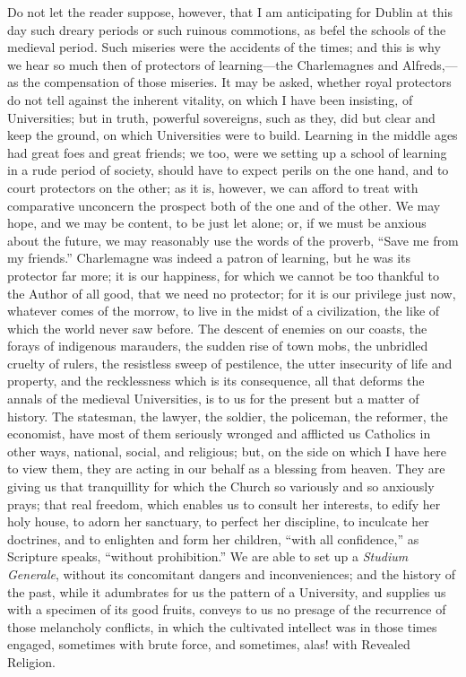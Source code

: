 Do not let the reader suppose, however, that I am anticipating for
Dublin at this day such dreary periods or such ruinous commotions, as
befel the schools of the medieval period. Such miseries were the
accidents of the times; and this is why we hear so much then of
protectors of learning—the Charlemagnes and Alfreds,—as the
compensation of those miseries. It may be asked, whether royal
protectors do not tell against the inherent vitality, on which I have
been insisting, of Universities; but in truth, powerful sovereigns,
such as they, did but clear and keep the ground, on which Universities
were to build. Learning in the middle ages had great foes and great
friends; we too, were we setting up a school of learning in a rude
period of society, should have to expect perils on the one hand, and
to court protectors on the other; as it is, however, we can afford to
treat with comparative unconcern the prospect both of the one and of
the other. We may hope, and we may be content, to be just let alone;
or, if we must be anxious about the future, we may reasonably use the
words of the proverb, ``Save me from my friends.'' Charlemagne
was indeed a patron of learning, but he was its protector far more; it
is our happiness, for which we cannot be too thankful to the Author of
all good, that we need no protector; for it is our privilege just now,
whatever comes of the morrow, to live in the midst of a civilization,
the like of which the world never saw before. The descent of enemies
on our coasts, the forays of indigenous marauders, the sudden rise of
town mobs, the unbridled cruelty of rulers, the resistless sweep of
pestilence, the utter insecurity of life and property, and the
recklessness which is its consequence, all that deforms the annals of
the medieval Universities, is to us for the present but a matter of
history. The statesman, the lawyer, the soldier, the policeman, the
reformer, the economist, have most of them seriously wronged and
afflicted us Catholics in other ways, national, social, and religious;
but, on the side on which I have here to view them, they are acting in
our behalf as a blessing from heaven. They are giving us that
tranquillity for which the Church so variously and so anxiously
prays; that real freedom, which enables us to consult her interests,
to edify her holy house, to adorn her sanctuary, to perfect her
discipline, to inculcate her doctrines, and to enlighten and form her
children, ``with all confidence,'' as Scripture speaks,
``without prohibition.'' We are able to set up a \emph{Studium
Generale}, without its concomitant dangers and inconveniences; and
the history of the past, while it adumbrates for us the pattern of a
University, and supplies us with a specimen of its good fruits,
conveys to us no presage of the recurrence of those melancholy
conflicts, in which the cultivated intellect was in those times
engaged, sometimes with brute force, and sometimes, alas! with
Revealed Religion.


